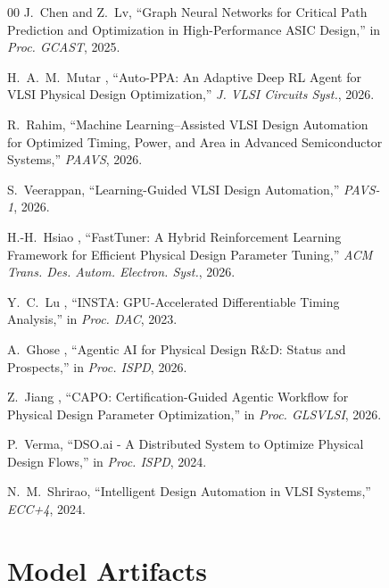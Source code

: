 \documentclass[10pt,conference]{IEEEtran}
\begin{document}
\begin{figure}[t]
\begin{thebibliography}{00}
J.~Chen and Z.~Lv, ``Graph Neural Networks for Critical Path Prediction and Optimization in High-Performance ASIC Design,'' in \textit{Proc. GCAST}, 2025.

H.~A.~M.~Mutar \etal, ``Auto-PPA: An Adaptive Deep RL Agent for VLSI Physical Design Optimization,'' \textit{J. VLSI Circuits Syst.}, 2026.

R.~Rahim, ``Machine Learning--Assisted VLSI Design Automation for Optimized Timing, Power, and Area in Advanced Semiconductor Systems,'' \textit{PAAVS}, 2026.

S.~Veerappan, ``Learning-Guided VLSI Design Automation,'' \textit{PAVS-1}, 2026.

H.-H.~Hsiao \etal, ``FastTuner: A Hybrid Reinforcement Learning Framework for Efficient Physical Design Parameter Tuning,'' \textit{ACM Trans. Des. Autom. Electron. Syst.}, 2026.

Y.~C.~Lu \etal, ``INSTA: GPU-Accelerated Differentiable Timing Analysis,'' in \textit{Proc. DAC}, 2023.

A.~Ghose \etal, ``Agentic AI for Physical Design R\&D: Status and Prospects,'' in \textit{Proc. ISPD}, 2026.

Z.~Jiang \etal, ``CAPO: Certification-Guided Agentic Workflow for Physical Design Parameter Optimization,'' in \textit{Proc. GLSVLSI}, 2026.

P.~Verma, ``DSO.ai - A Distributed System to Optimize Physical Design Flows,'' in \textit{Proc. ISPD}, 2024.

N.~M.~Shrirao, ``Intelligent Design Automation in VLSI Systems,'' \textit{ECC+4}, 2024.

\end{thebibliography}


\appendix

\section{Model Artifacts}
\label{app:artifacts}


\end{figure}
\end{document}
